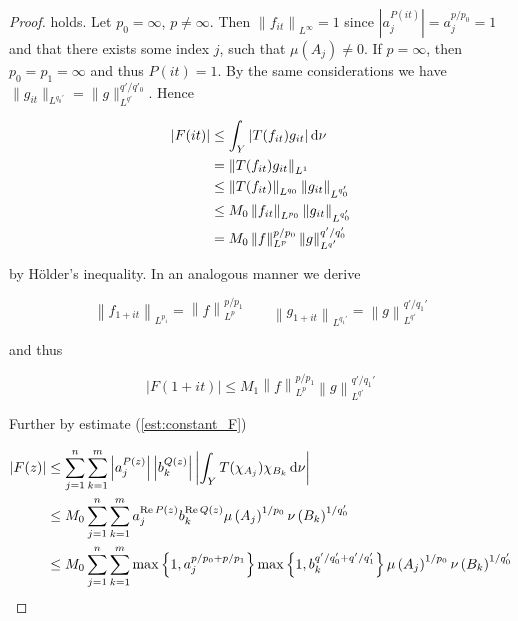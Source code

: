 \begin{proof}
\noindent holds. Let $p_0 = \infty$, $p \neq \infty$. Then $\left\|f_{it}\right\|_{L^{\infty}} = 1$ since $\left| a_j^{P(it)}\right| = a_j^{p/p_0} = 1$ and that there exists some index $j$, such that $\mu\left( A_j \right) \neq 0$. If $p = \infty$, then $p_0 = p_1 = \infty$ and thus $P(it) = 1$. By the same considerations we have $\|g_{it}\|_{L^{q_0'}} = \|g\|_{L^{q'}}^{q'/q'_0}$. Hence

\begin{gather*}
	\begin{aligned}
		\left| F(it) \right| &\leq \int_Y \left| T(f_{it})g_{it}\right| \mathop{}\!\mathrm{d}\nu\\
		&= \left\|T(f_{it}) g_{it}\right\|_{L^1}\\
		&\leq \left\|T(f_{it})\right\|_{L^{q_0}}\left\|g_{it}\right\|_{L^{q_0'}}\\
		&\leq M_0 \left\|f_{it}\right\|_{L^{p_0}} \left\|g_{it}\right\|_{L^{q_0'}}\\
		&= M_0 \left\|f\right\|_{L^p}^{p/p_0} \left\|g\right\|_{L^{q'}}^{q'/q'_0}
	\end{aligned}
\end{gather*}

\noindent by H\"older's inequality. In an analogous manner we derive
				
\begin{equation*}
	\left\|f_{1 + it}\right\|_{L^{p_1}} = \left\|f\right\|_{L^p}^{p/p_1} \qquad \left\|g_{1 + it}\right\|_{L^{q_1'}} = \left\|g\right\|_{L^{q'}}^{q'/q_1'}
\end{equation*}

\noindent and thus 
				
\begin{equation*}
	\left| F(1 + it)\right| \leq M_1 \left\|f\right\|_{L^p}^{p/p_1}\left\|g\right\|_{L^{q'}}^{q'/q_1'}
\end{equation*}	

Further by estimate (\ref{est:constant_F}) 

\begin{equation*}
	\begin{aligned}
		\left| F(z)\right| &\leq \sum_{j = 1}^n\sum_{k = 1}^m \left| a_j^{P(z)}\right| \left| b_k^{Q(z)}\right| \left| \int_Y T(\chi_{A_j})\chi_{B_k} \mathop{}\!\mathrm{d}\nu\right|\\
		&\leq M_0\sum_{j = 1}^n\sum_{k = 1}^m a_j^{\operatorname{Re} P(z)}b_k^{\operatorname{Re} Q(z)}\mu\left(A_j\right)^{1/p_0}\nu\left(B_k\right)^{1/q_0'}\\
		&\leq M_0\sum_{j = 1}^n\sum_{k = 1}^m \max\left\{ 1, a_j^{p/p_0 + p/p_1}\right\} \max\left\{1,b_k^{q'/q_0' + q'/q_1'}\right\}\mu\left(A_j\right)^{1/p_0}\nu\left(B_k\right)^{1/q_0'}
	\end{aligned}
\end{equation*}



\end{proof}
